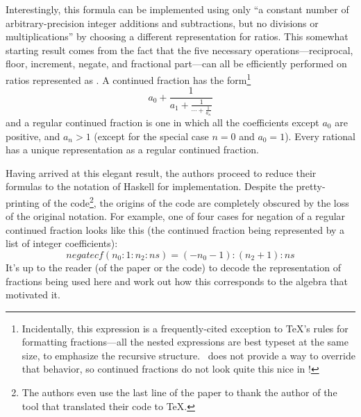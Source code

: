 Interestingly, this formula can be implemented using only ``a constant number of arbitrary-precision integer additions and subtractions, but no divisions or multiplications'' by choosing a different representation for ratios. This somewhat starting result comes from the fact that the five necessary operations---reciprocal, floor, increment, negate, and fractional part---can all be efficiently performed on ratios represented as . A continued fraction has the form\footnote{Incidentally, this expression is a frequently-cited exception to \TeX's rules for formatting fractions---all the nested expressions are best typeset at the same size, to emphasize the recursive structure. \Meta\ does not provide a way to override that behavior, so continued fractions do not look quite this nice in \Meta!}
$$a_0 + \frac{1}{
    \displaystyle a_1 + \frac{\displaystyle 1}{
        \displaystyle \cdots + \frac{\displaystyle 1}{
            \displaystyle a_n}}}$$
and a regular continued fraction is one in which all the coefficients except $a_0$ are positive, and $a_n > 1$ (except for the special case $n = 0$ and $a_0 = 1$). Every rational has a unique representation as a regular continued fraction.

Having arrived at this elegant result, the authors proceed to reduce their formulas to the notation of Haskell for implementation. Despite the pretty-printing of the code\footnote{The authors even use the last line of the paper to thank the author of the tool that translated their code to \TeX.}, the origins of the code are completely obscured by the loss of the original notation. For example, one of four cases for negation of a regular continued fraction looks like this (the continued fraction being represented by a list of integer coefficients):
$$\mathit{negatecf} (n_0 : 1 : n_2 : ns) = (-n_0 - 1) : (n_2 + 1) : ns$$
It's up to the reader (of the paper or the code) to decode the representation of fractions being used here and work out how this corresponds to the algebra that motivated it.

